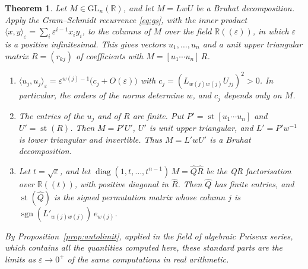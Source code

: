 \documentclass[12pt, a4paper]{report}
\theoremstyle{plain}
\newtheorem{theorem}{Theorem}[chapter]
\theoremstyle{definition}
\theoremstyle{remark}
\theoremstyle{plain}
\newcommand{\RR}{\mathbb{R}}
\newcommand{\GL}{\mathrm{GL}}
\newcommand{\sign}{\operatorname{sgn}}
\newcommand{\st}{\operatorname{st}}
\DeclareMathOperator{\diag}{diag}
\begin{document}
\begin{theorem}\label{thm:bruhat}
Let $M\in\GL_n(\RR)$, and let $M=LwU$ be a Bruhat decomposition. Apply the Gram--Schmidt recurrence \eqref{eq:gs}, with the inner product $\langle x,y\rangle_\varepsilon=\sum_i\varepsilon^{i-1}x_iy_i$, to the columns of $M$ over the field $\RR((\varepsilon))$, in which $\varepsilon$ is a positive infinitesimal. This gives vectors $u_1,\dots,u_n$ and a unit upper triangular matrix $R=(r_{kj})$ of coefficients with $M=[u_1\cdots u_n]\,R$.
\begin{enumerate}
  \item $\langle u_j,u_j\rangle_\varepsilon=\varepsilon^{w(j)-1}\bigl(c_j+O(\varepsilon)\bigr)$ with $c_j=(L_{w(j)w(j)}U_{jj})^2>0$. In particular, the orders of the norms determine $w$, and $c_j$ depends only on $M$.
  \item The entries of the $u_j$ and of $R$ are finite. Put $P'=\st[u_1\cdots u_n]$ and $U'=\st(R)$. Then $M=P'U'$, $U'$ is unit upper triangular, and $L'=P'w^{-1}$ is lower triangular and invertible. Thus $M=L'wU'$ is a Bruhat decomposition.
  \item Let $t=\sqrt\varepsilon$, and let $\diag(1,t,\dots,t^{n-1})\,M=\hat Q\hat R$ be the QR factorisation over $\RR((t))$, with positive diagonal in $\hat R$. Then $\hat Q$ has finite entries, and $\st(\hat Q)$ is the signed permutation matrix whose column $j$ is $\sign(L'_{w(j)w(j)})\,e_{w(j)}$.
\end{enumerate}
By Proposition~\ref{prop:autolimit}, applied in the field of algebraic Puiseux series, which contains all the quantities computed here, these standard parts are the limits as $\varepsilon\to0^+$ of the same computations in real arithmetic.
\end{theorem}
\end{document}
